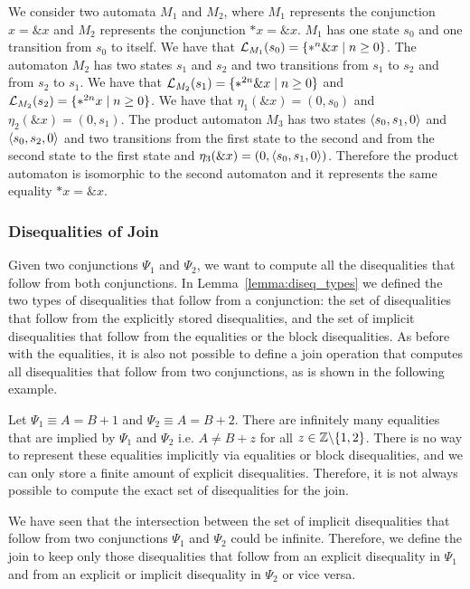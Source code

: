 \begin{example}\label{example:join-subset}
    We consider two automata $M_1$ and $M_2$, where $M_1$ represents the conjunction $x = \&x$ and $M_2$ represents the conjunction $*x = \&x$.
    $M_1$ has one state $s_0$ and one transition from $s_0$ to itself. We have that $\mathcal{L}_{M_1}(s_0) =\{*^n\&x\mid n \geq 0\}$.
    The automaton $M_2$ has two states $s_1$ and $s_2$ and two transitions from $s_1$ to $s_2$ and from $s_2$ to $s_1$. We have that $\mathcal{L}_{M_2}(s_1) = \{*^{2n}\&x\mid n \geq 0\}$ and $\mathcal{L}_{M_2}(s_2) = \{*^{2n}x\mid n \geq 0\}$.
    We have that $\eta_1(\&x) = (0, s_0)$ and $\eta_2 (\&x) = (0, s_1)$.
    The product automaton $M_3$ has two states $\langle s_0, s_1, 0\rangle$ and $\langle s_0, s_2, 0\rangle$ and two transitions from the first state to the second and from the second state to the first state and $\eta_3(\&x) = (0, \langle s_0, s_1, 0\rangle)$.
    Therefore the product automaton is isomorphic to the second automaton and it represents the same equality $*x = \&x$.
\end{example}

\subsubsection{Disequalities of Join}
Given two conjunctions $\Psi_1$ and $\Psi_2$, we want to compute all the disequalities that follow from both conjunctions.
In Lemma~\ref{lemma:diseq_types} we defined the two types of disequalities that follow from a conjunction: the set of disequalities that follow from the explicitly stored disequalities, and the set of implicit disequalities that follow from the equalities or the block disequalities.
As before with the equalities, it is also not possible to define a join operation that computes all disequalities that follow from two conjunctions, as is shown in the following example.

\begin{example}
    Let $\Psi_1 \equiv A = B + 1$ and $\Psi_2 \equiv A = B + 2$. There are infinitely many equalities that are implied by $\Psi_1$ and $\Psi_2$ i.e. $A \neq B + z$ for all $z \in \mathbb{Z} \backslash \{1,2\}$.
    There is no way to represent these equalities implicitly via equalities or block disequalities, and we can only store a finite amount of explicit disequalities. Therefore, it is not always possible to compute the exact set of disequalities for the join.
\end{example}

We have seen that the intersection between the set of implicit disequalities that follow from two conjunctions $\Psi_1$ and $\Psi_2$ could be infinite.
Therefore, we define the join to keep only those disequalities that follow from an explicit disequality in $\Psi_1$ and from an explicit or implicit disequality in $\Psi_2$ or vice versa.

